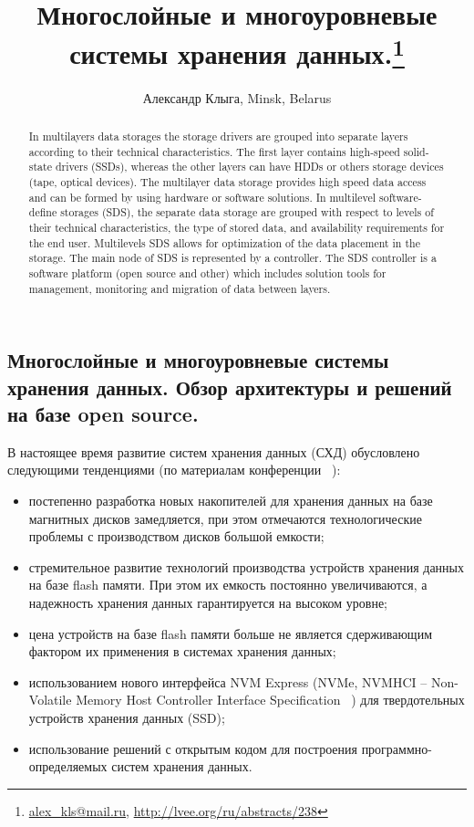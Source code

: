 \documentclass[10pt, a5paper]{article}
\begin{document}
\title{Многослойные и многоуровневые системы хранения данных.\footnote{\url{alex_kls@mail.ru}, \url{http://lvee.org/ru/abstracts/238}}}
\author{Александр Клыга, Minsk, Belarus}
\maketitle
\begin{abstract}
In multilayers data storages the storage drivers are grouped into
separate layers according to their technical characteristics. The first layer contains high-speed solid-state drivers (SSDs), whereas the other layers can have HDDs or others storage devices (tape, optical devices). The multilayer data storage provides high speed data access and can be formed by using hardware or software solutions. In multilevel software-define storages (SDS), the separate data storage are grouped with respect to levels of their technical characteristics, the type of stored data, and availability requirements for the end user. Multilevels SDS allows for optimization of the data placement in the storage. The main node of SDS is represented by a controller. The SDS controller is a software platform (open source and other) which includes solution tools for management, monitoring and migration of data between layers.
\end{abstract}
\subsection*{Многослойные и многоуровневые системы хранения данных. Обзор архитектуры и решений на базе open source.}

В настоящее время развитие систем хранения данных (СХД) обусловлено следующими тенденциями (по материалам конференции ~\cite{kliga-1}):

\begin{itemize}
  \item постепенно разработка новых накопителей для хранения данных на базе магнитных дисков замедляется, при этом отмечаются технологические проблемы с производством дисков большой емкости;
  \item стремительное развитие технологий производства устройств хранения данных на базе flash памяти. При этом их емкость  постоянно увеличиваются, а надежность хранения данных гарантируется на высоком уровне;
  \item цена устройств на базе flash памяти больше не является сдерживающим фактором их применения в системах хранения данных;
  \item использованием нового интерфейса NVM Express (NVMe, \linebreak NVMHCI -- Non-Volatile Memory Host Controller Interface \linebreak Specification ~\cite{kliga-2}) для твердотельных устройств хранения данных (SSD);
  \item использование решений с открытым кодом для  построения программно-определяемых систем хранения данных.
\end{itemize}
\end{document}

